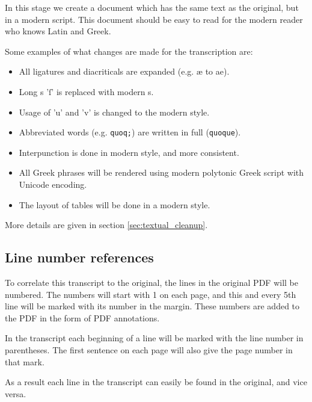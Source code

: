 \documentclass{report}
\begin{document}
In this stage we create a document which has the same text as the original,
but in a modern script.
This document should be easy to read for the modern reader who knows
Latin and Greek.

Some examples of what changes are made for the transcription are:

\begin{itemize}
\item All ligatures and diacriticals are expanded (e.g. æ to ae).
\item Long s 'ſ' is replaced with modern s.
\item Usage of 'u' and 'v' is changed to the modern style.
\item Abbreviated words (e.g. \verb+quoq;+) are written in full (\verb+quoque+).
\item Interpunction is done in modern style, and more consistent.
\item All Greek phrases will be rendered using modern polytonic Greek
script with Unicode encoding.
\item The layout of tables will be done in a modern style.
\end{itemize}
More details are given in section \ref{sec:textual_cleanup}.

\subsection{Line number references}
To correlate this transcript to the original, the lines
in the original PDF will be numbered.
The numbers will start with 1 on each page, and this and every 5th line
will be marked with its number in the margin.
These numbers are added to the PDF in the form of PDF annotations.

In the transcript each beginning of a line will be marked with the line number
in parentheses. The first sentence on each page will also give the page
number in that mark.

As a result each line in the transcript can easily be found in the original,
and vice versa.

\end{document}
